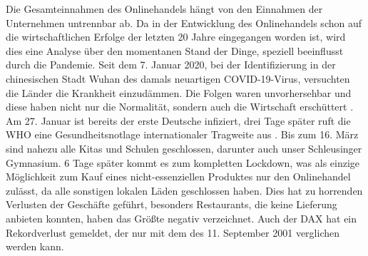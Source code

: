 Die Gesamteinnahmen des Onlinehandels hängt von den Einnahmen der Unternehmen untrennbar ab. Da in der Entwicklung des Onlinehandels schon auf die wirtschaftlichen Erfolge der letzten 20 Jahre eingegangen worden ist, wird dies eine Analyse über den momentanen Stand der Dinge, speziell beeinflusst durch die Pandemie.
Seit dem 7. Januar 2020, bei der Identifizierung in der chinesischen Stadt Wuhan des damals neuartigen COVID-19-Virus, versuchten die Länder die Krankheit einzudämmen. Die Folgen waren unvorhersehbar und diese haben nicht nur die Normalität, sondern auch die Wirtschaft erschüttert \cite{who}. Am 27. Januar ist bereits der erste Deutsche infiziert, drei Tage später ruft die WHO eine Gesundheitsnotlage internationaler Tragweite aus \cite{mdr-aktuell}. Bis zum 16. März sind nahezu alle Kitas und Schulen geschlossen, darunter auch unser Schleusinger Gymnasium. 6 Tage später kommt es zum kompletten Lockdown, was als einzige Möglichkeit zum Kauf eines nicht-essenziellen Produktes nur den Onlinehandel zulässt, da alle sonstigen lokalen Läden geschlossen haben. Dies hat zu horrenden Verlusten der Geschäfte geführt, besonders Restaurants, die keine Lieferung anbieten konnten, haben das Größte negativ verzeichnet. Auch der DAX hat ein Rekordverlust gemeldet, der nur mit dem des 11. September 2001 verglichen werden kann.
